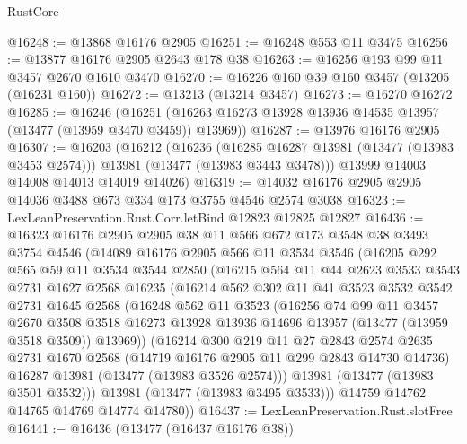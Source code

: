 \begin{lexlean}{RustCore}
\begin{coremodule}
@16248 := @13868 @16176 @2905
@16251 := @16248 @553 @11 @3475
@16256 := @13877 @16176 @2905 @2643 @178 @38
@16263 := @16256 @193 @99 @11 @3457 @2670 @1610 @3470
@16270 := @16226 @160 @39 @160 @3457 (@13205 (@16231 @160))
@16272 := @13213 (@13214 @3457)
@16273 := @16270 @16272
@16285 := @16246
    (@16251 (@16263 @16273 @13928 @13936 @14535 @13957 (@13477 (@13959 @3470 @3459)) @13969))
@16287 := @13976 @16176 @2905
@16307 := @16203
    (@16212
      (@16236
        (@16285 @16287 @13981 (@13477 (@13983 @3453 @2574)))
        @13981
        (@13477 (@13983 @3443 @3478)))
      @13999
      @14003
      @14008
      @14013
      @14019
      @14026)
@16319 := @14032 @16176 @2905 @2905 @14036 @3488 @673 @334 @173 @3755 @4546 @2574 @3038
@16323 := LexLeanPreservation.Rust.Corr.letBind @12823 @12825 @12827
@16436 := @16323
    @16176
    @2905
    @2905
    @38
    @11
    @566
    @672
    @173
    @3548
    @38
    @3493
    @3754
    @4546
    (@14089
      @16176
      @2905
      @566
      @11
      @3534
      @3546
      (@16205
        @292
        @565
        @59
        @11
        @3534
        @3544
        @2850
        (@16215
          @564
          @11
          @44
          @2623
          @3533
          @3543
          @2731
          @1627
          @2568
          @16235
          (@16214
            @562
            @302
            @11
            @41
            @3523
            @3532
            @3542
            @2731
            @1645
            @2568
            (@16248
              @562
              @11
              @3523
              (@16256
                @74
                @99
                @11
                @3457
                @2670
                @3508
                @3518
                @16273
                @13928
                @13936
                @14696
                @13957
                (@13477 (@13959 @3518 @3509))
                @13969))
            (@16214
              @300
              @219
              @11
              @27
              @2843
              @2574
              @2635
              @2731
              @1670
              @2568
              (@14719 @16176 @2905 @11 @299 @2843 @14730 @14736)
              @16287
              @13981
              (@13477 (@13983 @3526 @2574)))
            @13981
            (@13477 (@13983 @3501 @3532)))
          @13981
          (@13477 (@13983 @3495 @3533)))
        @14759
        @14762
        @14765
        @14769
        @14774
        @14780))
@16437 := LexLeanPreservation.Rust.slotFree
@16441 := @16436 (@13477 (@16437 @16176 @38))

\end{coremodule}
\end{lexlean}

